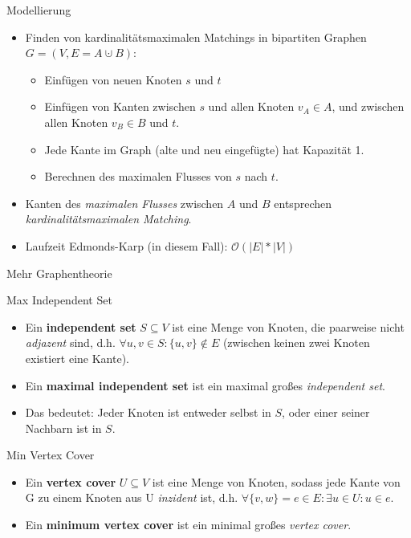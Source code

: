 \documentclass[18pt]{beamer}
\begin{document}
\begin{frame}{Modellierung}
\begin{itemize}
\item Finden von kardinalit\"atsmaximalen Matchings in bipartiten Graphen $G = (V, E = A \cupdot B)$:
\begin{itemize}
	\item Einf\"ugen von neuen Knoten $s$ und $t$
	\item Einf\"ugen von Kanten zwischen $s$ und allen Knoten $v_{A} \in A$, und zwischen allen Knoten $v_{B} \in B$ und $t$.
	\item Jede Kante im Graph (alte und neu eingef\"ugte) hat Kapazit\"at 1.
	\item Berechnen des maximalen Flusses von $s$ nach $t$.
\end{itemize}
\item Kanten des \textit{maximalen Flusses} zwischen $A$ und $B$ entsprechen \textit{kardinalit\"atsmaximalen Matching}.
\item Laufzeit Edmonds-Karp (in diesem Fall): $\mathcal{O}(|E| * |V|)$
\end{itemize}
\end{frame}

\begin{frame}{Mehr Graphentheorie}
\begin{block}{Max Independent Set}
\begin{itemize}
\item Ein \textbf{independent set} $S \subseteq V$ ist eine Menge von Knoten, die paarweise nicht \textit{adjazent} sind,
d.h. $\forall u, v \in S: \{u, v\} \notin E$ (zwischen keinen zwei Knoten existiert eine Kante).
\item Ein \textbf{maximal independent set} ist ein maximal gro{\ss}es \textit{independent set}.
\item Das bedeutet: Jeder Knoten ist entweder selbst in $S$, oder einer seiner Nachbarn ist in $S$.
\end{itemize}
\end{block}

\pause

\begin{block}{Min Vertex Cover}
\begin{itemize}
\item Ein \textbf{vertex cover} $U \subseteq V$ ist eine Menge von Knoten, sodass jede Kante von G zu einem Knoten aus U \textit{inzident} ist,
d.h. $\forall \{v, w\} = e \in E: \exists u \in U: u \in e$.
\item Ein \textbf{minimum vertex cover} ist ein minimal gro{\ss}es \textit{vertex cover}.
\end{itemize}
\end{block}
\end{frame}
\end{document}
